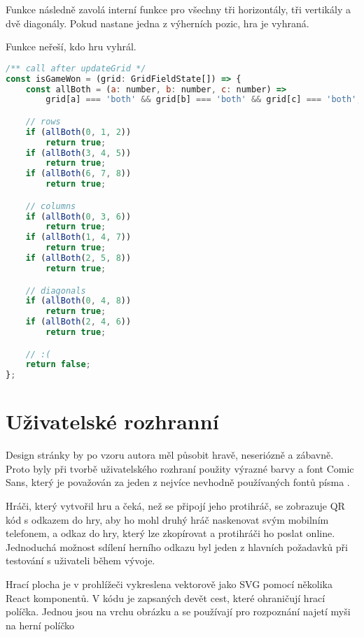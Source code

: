 Funkce  následně zavolá interní funkce  pro všechny tři
horizontály, tři vertikály a dvě diagonály. Pokud nastane jedna z výherních
pozic, hra je vyhraná.

Funkce neřeší, kdo hru vyhrál.

\begin{lstlisting}[language=JavaScript,caption={Funkce \M{isGameWon}},label={lst:is-game-won}]
/** call after updateGrid */
const isGameWon = (grid: GridFieldState[]) => {
    const allBoth = (a: number, b: number, c: number) =>
        grid[a] === 'both' && grid[b] === 'both' && grid[c] === 'both';

    // rows
    if (allBoth(0, 1, 2))
        return true;
    if (allBoth(3, 4, 5))
        return true;
    if (allBoth(6, 7, 8))
        return true;

    // columns
    if (allBoth(0, 3, 6))
        return true;
    if (allBoth(1, 4, 7))
        return true;
    if (allBoth(2, 5, 8))
        return true;

    // diagonals
    if (allBoth(0, 4, 8))
        return true;
    if (allBoth(2, 4, 6))
        return true;

    // :(
    return false;
};
\end{lstlisting}

\section{Uživatelské rozhranní}

Design stránky by po vzoru autora měl působit hravě, neseriózně a zábavně.
Proto byly při tvorbě uživatelského rozhraní použity výrazné barvy a font Comic
Sans, který je považován za jeden z nejvíce nevhodně používaných fontů písma
\cite{seddon2011}.

Hráči, který vytvořil hru a čeká, než se připojí jeho protihráč, se zobrazuje
QR kód s odkazem do hry, aby ho mohl druhý hráč naskenovat svým mobilním
telefonem, a odkaz do hry, který lze zkopírovat a protihráči ho poslat online.
Jednoduchá možnost sdílení herního odkazu byl jeden z hlavních požadavků při
testování s uživateli během vývoje.

Hrací plocha je v prohlížeči vykreslena vektorově jako SVG pomocí několika
React komponentů. V kódu je zapsaných devět cest, které ohraničují hrací
políčka. Jednou jsou na vrchu obrázku a se používají pro rozpoznání najetí myši
na herní políčko
